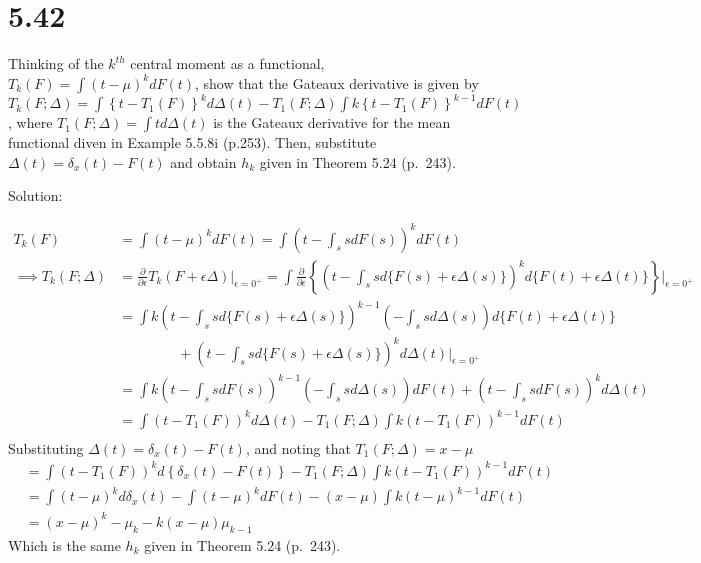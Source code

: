 \documentclass[
  letterpaper,
  DIV=11,
  numbers=noendperiod]{scrreprt}
\begin{document}
\hypertarget{section-36}{%
\section{5.42}\label{section-36}}

Thinking of the \(k^{th}\) central moment as a functional,
\(T_k(F)= \int (t-\mu)^k d F(t)\), show that the Gateaux derivative is
given by
\(T_k(F;\Delta) = \int \left\{t-T_1(F)\right\}^k d \Delta(t) - T_1(F;\Delta) \int k \left\{t-T_1(F) \right\}^{k-1} d F(t)\),
where \(T_1(F;\Delta) = \int t d \Delta(t)\) is the Gateaux derivative
for the mean functional diven in Example 5.5.8i (p.253). Then,
substitute \(\Delta(t)= \delta_x(t)- F(t)\) and obtain \(h_k\) given in
Theorem 5.24 (p.~243).

Solution:

\[
\begin{aligned}
T_k(F) &= \int (t-\mu)^k d F(t) =\int \left(t-\int_s s dF(s)\right)^k dF(t) \\
\implies T_k(F;\Delta) &= \frac{\partial}{\partial \epsilon} T_k(F+\epsilon \Delta) \bigg|_{\epsilon = 0^+} = \int\frac{\partial}{\partial \epsilon} \left\{ \left(t-\int_s s d\{F(s)+\epsilon \Delta(s) \}\right)^k d \{F(t)+\epsilon \Delta(t) \} \right\}  \bigg|_{\epsilon = 0^+} \\
&= \int k\left(t-\int_s s d\{F(s)+\epsilon \Delta(s) \}\right)^{k-1}\left(-\int_s s d \Delta(s)\right) d \{F(t)+\epsilon \Delta(t) \} \\
&~~~~~~~~~~~~~~~~~~~+\left(t-\int_s s d\{F(s)+\epsilon \Delta(s) \}\right)^k d\Delta(t) \bigg|_{\epsilon = 0^+} \\
&= \int k\left(t-\int_s s dF(s)\right)^{k-1}\left(-\int_s s d \Delta(s)\right) d F(t) +\left(t-\int_s s dF(s)\right)^k d\Delta(t)  \\
&=\int \left(t-T_1(F)\right)^k d\Delta(t) -T_1(F;\Delta)\int k\left(t-T_1(F)\right)^{k-1} d F(t)   \\
\end{aligned}
\] Substituting \(\Delta(t)= \delta_x(t)- F(t)\), and noting that
\(T_1(F;\Delta) = x-\mu\) \[
\begin{aligned}
&= \int \left(t-T_1(F)\right)^k d\left\{\delta_x(t)- F(t)\right\} -T_1(F;\Delta)\int k\left(t-T_1(F)\right)^{k-1} d F(t) \\
&= \int \left(t-\mu\right)^k d\delta_x(t)- \int \left(t-\mu\right)^kdF(t) -(x-\mu)\int k\left(t-\mu\right)^{k-1} d F(t) \\
&= \left(x-\mu\right)^k - \mu_k -k (x-\mu)\mu_{k-1}  
\end{aligned}
\] Which is the same \(h_k\) given in Theorem 5.24 (p.~243).
\end{document}
